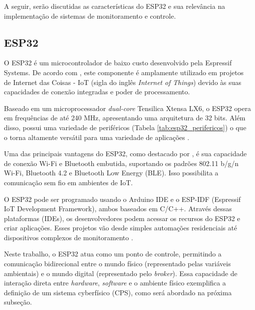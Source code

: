 A seguir, serão discutidas as características do ESP32 e sua relevância  na implementação de sistemas de monitoramento e controle.

\subsection{ESP32}

O ESP32 é um microcontrolador de baixo custo desenvolvido pela Espressif Systems. De acordo com \textcite{ESP32_usage}, este componente é amplamente utilizado em projetos de Internet das Coisas - IoT (sigla do inglês \textit{Internet of Things}) devido às suas capacidades de conexão integradas e poder de processamento.

Baseado em um microprocessador \textit{dual-core} Tensilica Xtensa LX6, o ESP32 opera em frequências de até 240 MHz, apresentando uma arquitetura de 32 bits. Além disso, possui uma variedade de periféricos (Tabela \ref{tab:esp32_perifericos}) o que o torna altamente versátil para uma variedade de aplicações \parencite{EspressifESP32}.

Uma das principais vantagens do ESP32, como destacado por \textcite{ESP32_usage}, é sua capacidade de conexão Wi-Fi e Bluetooth embutida, suportando os padrões 802.11 b/g/n Wi-Fi, Bluetooth 4.2 e Bluetooth Low Energy (BLE). Isso possibilita a comunicação sem fio em ambientes de IoT.

O ESP32 pode ser programado usando o Arduino IDE e o ESP-IDF (Espressif IoT Development Framework), ambos baseados em C/C++. Através dessas plataformas (IDEs), os desenvolvedores podem acessar os recursos do ESP32 e criar aplicações. Esses projetos vão desde simples automações residenciais até dispositivos complexos de monitoramento \parencite{ferrandez2018precision, junior2022data, hsu2020creative}.

Neste trabalho, o ESP32 atua como um ponto de controle, permitindo a comunicação bidirecional entre o mundo físico (representado pelas variáveis ambientais) e o mundo digital (representado pelo \textit{broker}). Essa capacidade de interação direta entre \textit{hardware}, \textit{software} e o ambiente físico exemplifica a definição de um sistema cyberfísico (CPS), como será abordado na próxima subseção.

